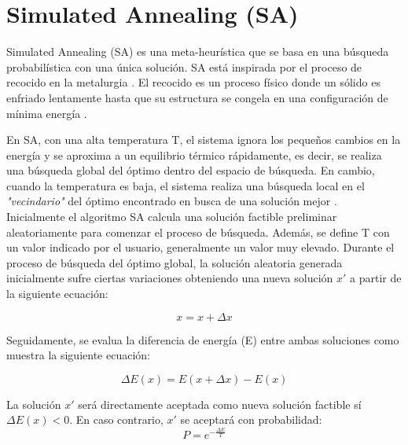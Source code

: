 \section{Simulated Annealing (SA)}
\label{sec:SA}

Simulated Annealing (SA) \cite{SA1, SA2, SA3} es una meta-heurística que se basa en una búsqueda probabilística con una única solución. SA está inspirada por el proceso de recocido en la metalurgia \cite{metabook}. El recocido es un proceso físico donde un sólido es enfriado lentamente hasta que su estructura se congela en una configuración de mínima energía \cite{metabook}.

En SA, con una alta temperatura T, el sistema ignora los pequeños cambios en la energía y se aproxima a un equilibrio térmico rápidamente, es decir, se realiza una búsqueda global del óptimo dentro del espacio de búsqueda. En cambio, cuando la temperatura es baja, el sistema realiza una búsqueda local en el \textit{"vecindario"} del óptimo encontrado en busca de una solución mejor \cite{metabook}. \\

Inicialmente el algoritmo SA calcula una solución factible preliminar aleatoriamente para comenzar el proceso de búsqueda. Además, se define T con un valor indicado por el usuario, generalmente un valor muy elevado.
Durante el proceso de búsqueda del óptimo global, la solución aleatoria generada inicialmente sufre ciertas variaciones obteniendo una nueva solución $x'$ a partir de la siguiente ecuación: 

\begin{equation}\label{eq:perturbation}
    x = x + \Delta x
\end{equation}

Seguidamente, se evalua la diferencia de energía (E) entre ambas soluciones como muestra la siguiente ecuación:

\begin{equation}\label{eq:evaluate}
    \Delta E(x) = E(x + \Delta x) - E(x)
\end{equation}

La solución $x'$ será directamente aceptada como nueva solución factible sí \\ $\Delta E(x) < 0$. En caso contrario, $x'$ se aceptará con probabilidad: \\

\begin{equation}\label{eq:other}
    P = e^{- \frac{\Delta E}{T}}
\end{equation}

